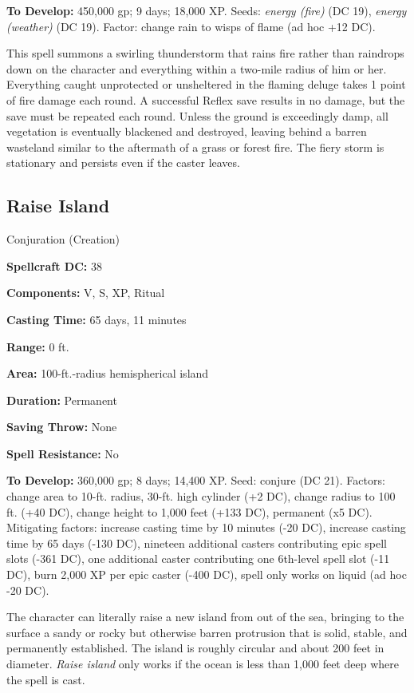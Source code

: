 \documentclass{article}
\begin{document}
\textbf{To Develop:} 450,000 gp; 9 days; 18,000 XP. Seeds: \textit{energy (fire) 
}(DC 19), \textit{energy (weather) }(DC 19). Factor: change rain to wisps of flame 
(ad hoc +12 DC). 

This spell summons a swirling thunderstorm that rains fire rather than raindrops 
down on the character and everything within a two-mile radius of him or her. Everything 
caught unprotected or unsheltered in the flaming deluge takes 1 point of fire damage 
each round. A successful Reflex save results in no damage, but the save must be 
repeated each round. Unless the ground is exceedingly damp, all vegetation is eventually 
blackened and destroyed, leaving behind a barren wasteland similar to the aftermath 
of a grass or forest fire. The fiery storm is stationary and persists even if the 
caster leaves. 

\vspace{12pt}
\subsection*{Raise Island }

Conjuration (Creation) 

\textbf{Spellcraft DC:} 38 

\textbf{Components:} V, S, XP, Ritual

\textbf{Casting Time:} 65 days, 11 minutes 

\textbf{Range:} 0 ft. 

\textbf{Area:} 100-ft.-radius hemispherical island 

\textbf{Duration:} Permanent

\textbf{Saving Throw:} None 

\textbf{Spell Resistance:} No 

\textbf{To Develop:} 360,000 gp; 8 days; 14,400 XP. Seed: conjure (DC 21). Factors: 
change area to 10-ft. radius, 30-ft. high cylinder (+2 DC), change radius to 100 
ft. (+40 DC), change height to 1,000 feet (+133 DC), permanent (x5 DC). Mitigating 
factors: increase casting time by 10 minutes (-20 DC), increase casting time by 
65 days (-130 DC), nineteen additional casters contributing epic spell slots (-361 
DC), one additional caster contributing one 6th-level spell slot (-11 DC), burn 
2,000 XP per epic caster (-400 DC), spell only works on liquid (ad hoc -20 DC).

The character can literally raise a new island from out of the sea, bringing to 
the surface a sandy or rocky but otherwise barren protrusion that is solid, stable, 
and permanently established. The island is roughly circular and about 200 feet 
in diameter. \textit{Raise island }only works if the ocean is less than 1,000 feet 
deep where the spell is cast.
\end{document}
